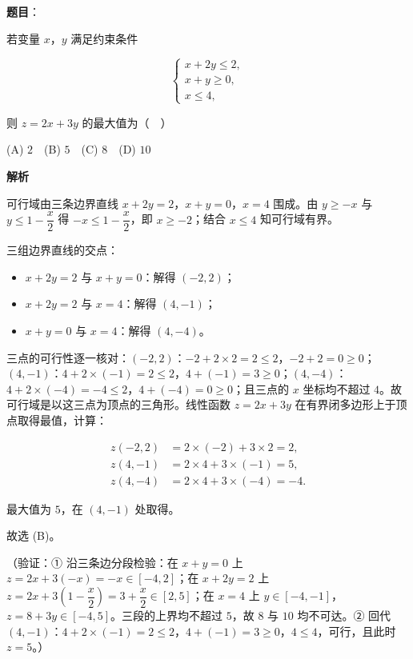 \begin{answer}

\textbf{题目}：

若变量 \(x\)，\(y\) 满足约束条件

\nopagebreak[4]
\[
\begin{cases}
x+2y\leqslant 2,\\
x+y\geqslant 0,\\
x\leqslant 4,
\end{cases}
\]

则 \(z=2x+3y\) 的最大值为（　）

(A) \(2\)　(B) \(5\)　(C) \(8\)　(D) \(10\)

\textbf{解析}

可行域由三条边界直线 \(x+2y=2\)，\(x+y=0\)，\(x=4\) 围成。由 \(y\geqslant -x\) 与 \(y\leqslant 1-\dfrac{x}{2}\) 得 \(-x\leqslant 1-\dfrac{x}{2}\)，即 \(x\geqslant -2\)；结合 \(x\leqslant 4\) 知可行域有界。

三组边界直线的交点：

\begin{itemize}
\item \(x+2y=2\) 与 \(x+y=0\)：解得 \((-2,2)\)；
\item \(x+2y=2\) 与 \(x=4\)：解得 \((4,-1)\)；
\item \(x+y=0\) 与 \(x=4\)：解得 \((4,-4)\)。
\end{itemize}

三点的可行性逐一核对：\((-2,2)\)：\(-2+2\times 2=2\leqslant 2\)，\(-2+2=0\geqslant 0\)；\((4,-1)\)：\(4+2\times(-1)=2\leqslant 2\)，\(4+(-1)=3\geqslant 0\)；\((4,-4)\)：\(4+2\times(-4)=-4\leqslant 2\)，\(4+(-4)=0\geqslant 0\)；且三点的 \(x\) 坐标均不超过 \(4\)。故可行域是以这三点为顶点的三角形。线性函数 \(z=2x+3y\) 在有界闭多边形上于顶点取得最值，计算：

\nopagebreak[4]
\[
\begin{aligned}
z(-2,2)&=2\times(-2)+3\times 2=2,\\
z(4,-1)&=2\times 4+3\times(-1)=5,\\
z(4,-4)&=2\times 4+3\times(-4)=-4.
\end{aligned}
\]

最大值为 \(5\)，在 \((4,-1)\) 处取得。

故选 (B)。

（验证：① 沿三条边分段检验：在 \(x+y=0\) 上 \(z=2x+3(-x)=-x\in[-4,2]\)；在 \(x+2y=2\) 上 \(z=2x+3\left(1-\dfrac{x}{2}\right)=3+\dfrac{x}{2}\in[2,5]\)；在 \(x=4\) 上 \(y\in[-4,-1]\)，\(z=8+3y\in[-4,5]\)。三段的上界均不超过 \(5\)，故 \(8\) 与 \(10\) 均不可达。② 回代 \((4,-1)\)：\(4+2\times(-1)=2\leqslant 2\)，\(4+(-1)=3\geqslant 0\)，\(4\leqslant 4\)，可行，且此时 \(z=5\)。）


\end{answer}
